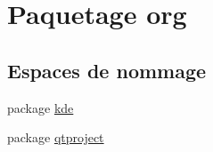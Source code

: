 \hypertarget{namespaceorg}{\section{Paquetage org}
\label{namespaceorg}
}
\subsection*{Espaces de nommage}
\begin{DoxyCompactItemize}
\item 
package \hyperlink{namespaceorg_1_1kde}{kde}
\item 
package \hyperlink{namespaceorg_1_1qtproject}{qtproject}
\end{DoxyCompactItemize}
